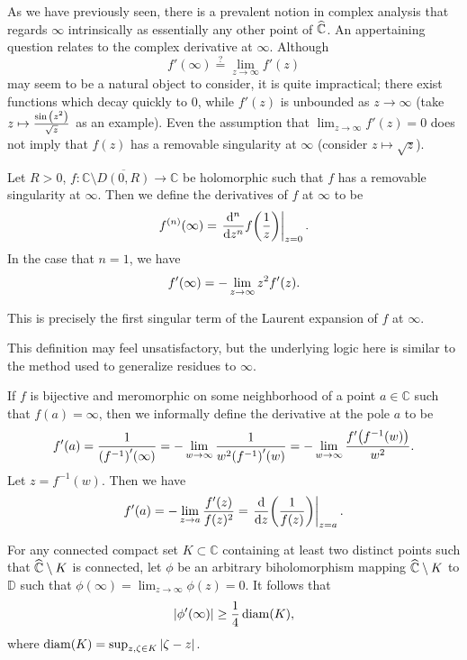 As we have previously seen, there is a prevalent notion in complex analysis that regards \(\infty\) intrinsically as essentially any other point of \(\widehat{\mathbb{C}}\). An appertaining question relates to the complex derivative at \(\infty\). Although \[f'(\infty)\overset{?}{=}\lim_{z\to\infty} f'(z)\] may seem to be a natural object to consider, it is quite impractical; there exist functions which decay quickly to 0, while \(f'(z)\) is unbounded as \(z\to\infty\) (take \(z\mapsto\frac{\sin\qty(z^2)}{\sqrt{z}}\) as an example). Even the assumption that \(\lim_{z\to\infty}f'(z)=0\) does not imply that \(f(z)\) has a removable singularity at \(\infty\) (consider \(z\mapsto\sqrt{z}\)).
\begin{definition}
    Let \(R>0\), \(f:\mathbb{C}\setminus\overline{D(0,R)}\to\mathbb{C}\) be holomorphic such that \(f\) has a removable singularity at \(\infty\). Then we define the derivatives of \(f\) at \(\infty\) to be \[f^{(n)}(\infty)=\eval{\dv[n]{z}f\qty(\frac1z)}_{z=0}.\]
    In the case that \(n=1\), we have
    \begin{equation}
        f'(\infty)=-\lim_{z\to\infty}z^2 f'\qty(z).\label{eq:derivativeatinfinity}
    \end{equation}
\end{definition} This is precisely the first singular term of the Laurent expansion of \(f\) at \(\infty\).
\begin{remark}
    This definition may feel unsatisfactory, but the underlying logic here is similar to the method used to generalize residues to \(\infty\).
\end{remark}
If \(f\) is bijective and meromorphic on some neighborhood of a point \(a\in\mathbb{C}\) such that \(f(a)=\infty\), then we informally define the derivative at the pole \(a\) to be
\begin{equation}
    f'(a)=\frac{1}{\qty(f^{-1})'\qty(\infty)}=-\lim_{w\to\infty}\frac{1}{w^2\qty(f^{-1})'(w)}=-\lim_{w\to\infty}\frac{f'\qty(f^{-1}(w))}{w^2}.\label{eq:derivativeatpole1}
\end{equation}
Let \(z=f^{-1}(w)\). Then we have
\begin{equation}
    f'(a)=-\lim_{z\to a}\frac{f'(z)}{f(z)^2}=\eval{\dv{z}(\frac{1}{f(z)})}_{z=a}.\label{eq:derivativeatpole2}
\end{equation}
\begin{proposition}\label{prop:complementbiholomorphismquarterestimate}
    For any connected compact set \(K\subset\mathbb{C}\) containing at least two distinct points such that \(\widehat{\mathbb{C}}\setminus K\) is connected, let \(\phi\) be an arbitrary biholomorphism mapping \(\widehat{\mathbb{C}}\setminus K\) to \(\mathbb{D}\) such that \(\phi(\infty)=\lim_{z\to\infty}\phi(z)=0\). It follows that \[\abs{\phi'(\infty)}\geq\frac14\operatorname{diam}(K),\] where \(\operatorname{diam}(K)=\sup_{z,\zeta\in K}\abs{\zeta-z}\).
\end{proposition}
